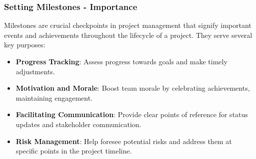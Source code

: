 \documentclass[aspectratio=169]{beamer}
\begin{document}
\begin{frame}[fragile]
    \frametitle{Setting Milestones - Importance}
    Milestones are crucial checkpoints in project management that signify important events and achievements throughout the lifecycle of a project. They serve several key purposes:
    \begin{itemize}
        \item \textbf{Progress Tracking}: Assess progress towards goals and make timely adjustments.
        
        \item \textbf{Motivation and Morale}: Boost team morale by celebrating achievements, maintaining engagement.
        
        \item \textbf{Facilitating Communication}: Provide clear points of reference for status updates and stakeholder communication.
        
        \item \textbf{Risk Management}: Help foresee potential risks and address them at specific points in the project timeline.
    \end{itemize}
\end{frame}
\end{document}
